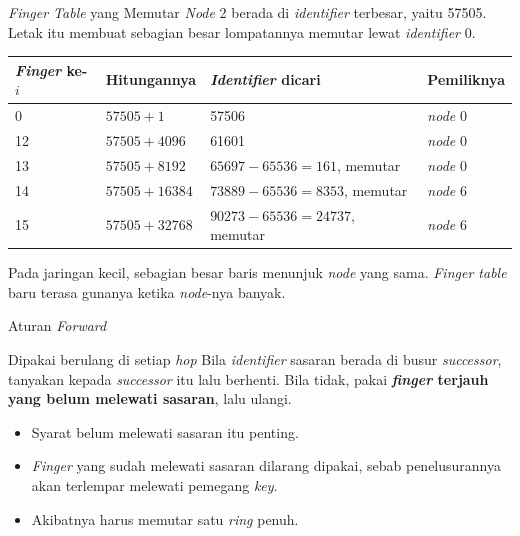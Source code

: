 \documentclass[aspectratio=169, table, 12pt]{beamer}
\begin{document}
\begin{frame}{{\Large \textit{Finger Table} yang Memutar}}
  \vspace{6pt}
  {\small \textit{Node} 2 berada di \textit{identifier} terbesar, yaitu 57505. Letak itu
  membuat sebagian besar lompatannya memutar lewat \textit{identifier} 0.}
  \vspace{6pt}
  \centering
  \scriptsize
  \begin{tabularx}{0.95\textwidth}{|l|l|X|l|}
    \hline
    \textbf{\textit{Finger} ke-$i$} & \textbf{Hitungannya} & \textbf{\textit{Identifier} dicari} & \textbf{Pemiliknya} \\
    \hline
    0 & $57505 + 1$ & 57506 & \textit{node} 0 \\
    \hline
    12 & $57505 + 4096$ & 61601 & \textit{node} 0 \\
    \hline
    13 & $57505 + 8192$ & $65697 - 65536 = 161$, memutar & \textit{node} 0 \\
    \hline
    14 & $57505 + 16384$ & $73889 - 65536 = 8353$, memutar & \textit{node} 6 \\
    \hline
    15 & $57505 + 32768$ & $90273 - 65536 = 24737$, memutar & \textit{node} 6 \\
    \hline
  \end{tabularx}

  \vspace{5pt}
  {\footnotesize Pada jaringan kecil, sebagian besar baris menunjuk
  \textit{node} yang sama. \textit{Finger table} baru terasa gunanya ketika
  \textit{node}-nya banyak.}
\end{frame}

\begin{frame}{{\Large Aturan \textit{Forward}}}
  \vspace{16pt}
  \begin{block}{Dipakai berulang di setiap \textit{hop}}
    Bila \textit{identifier} sasaran berada di busur \textit{successor}, tanyakan kepada \textit{successor} itu lalu
    berhenti. Bila tidak, pakai \textbf{\textit{finger} terjauh yang belum melewati
    sasaran}, lalu ulangi.
  \end{block}
  \vspace{12pt}
  \begin{itemize}\small
    \item Syarat belum melewati sasaran itu penting.
    \item \textit{Finger} yang sudah melewati sasaran dilarang dipakai, sebab
          penelusurannya akan terlempar melewati pemegang \textit{key}.
    \item Akibatnya harus memutar satu \textit{ring} penuh.
  \end{itemize}
\end{frame}
\end{document}
